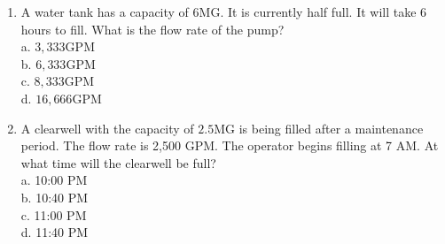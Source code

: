 \documentclass[10pt]{article}
\begin{document}
\begin{enumerate}
  \item A water tank has a capacity of 6MG. It is currently half full. It will take 6 hours to fill. What is the flow rate of the pump?\\
a. $3,333 \mathrm{GPM}$\\
b. $6,333 \mathrm{GPM}$\\
c. $8,333 \mathrm{GPM}$\\
d. $16,666 \mathrm{GPM}$

  \item A clearwell with the capacity of $2.5 \mathrm{MG}$ is being filled after a maintenance period. The flow rate is 2,500 GPM. The operator begins filling at 7 AM. At what time will the clearwell be full?\\
a. 10:00 PM\\
b. 10:40 PM\\
c. 11:00 PM\\
d. 11:40 PM

\end{enumerate}
\end{document}
